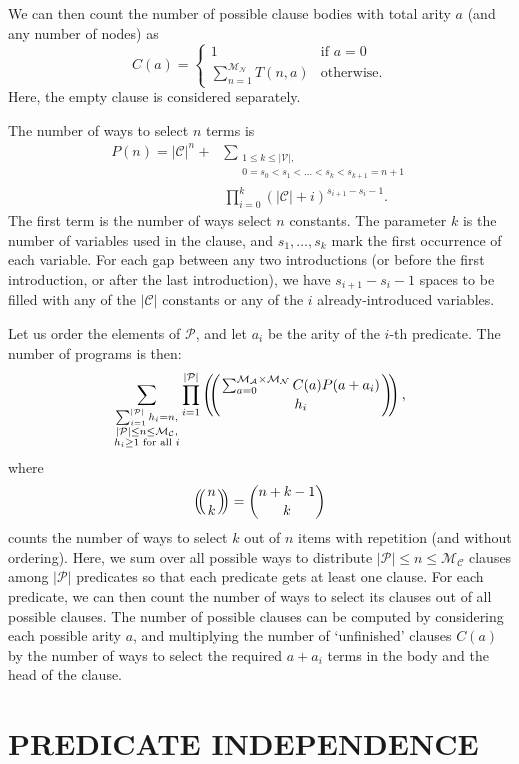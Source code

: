 \documentclass[letterpaper]{article}
\theoremstyle{definition}
\newcommand{\predicates}{\mathcal{P}}
\newcommand{\variables}{\mathcal{V}}
\newcommand{\constants}{\mathcal{C}}
\newcommand{\maxArity}{\mathcal{M}_{\mathcal{A}}}
\newcommand{\maxNumNodes}{\mathcal{M}_{\mathcal{N}}}
\newcommand{\maxNumClauses}{\mathcal{M}_{\mathcal{C}}}
\def\multiset#1#2{\ensuremath{\left(\kern-.3em\left(\genfrac{}{}{0pt}{}{#1}{#2}\right)\kern-.3em\right)}}
\begin{document}
We can then count the number of possible clause bodies with total arity $a$ (and
any number of nodes) as
\[
  C(a) = \begin{cases}
    1 & \text{if } a = 0\\
    \sum_{n=1}^{\maxNumNodes{}} T(n, a) & \text{otherwise.}
  \end{cases}
\]
Here, the empty clause is considered separately.

The number of ways to select $n$ terms is
\begin{align*}
  P(n) = |\constants{}|^n + &\sum_{\substack{1 \le k \le |\variables{}|, \\ 0 =
      s_0 < s_1 < \dots < s_k < s_{k+1} = n+1}}\\
  &\prod_{i=0}^k (|\constants{}| + i)^{s_{i+1} - s_i - 1}.
\end{align*}
The first term is the number of ways select $n$ constants. The parameter $k$ is
the number of variables used in the clause, and $s_1, \dots, s_k$ mark the first
occurrence of each variable. For each gap between any two introductions (or
before the first introduction, or after the last introduction), we have
$s_{i+1}-s_i-1$ spaces to be filled with any of the $|\constants{}|$ constants
or any of the $i$ already-introduced variables.

Let us order the elements of $\predicates{}$, and let $a_i$ be the arity of the
$i$-th predicate. The number of programs is then:
\[
  \sum_{\substack{ \sum_{i=1}^{|\predicates{}|} h_i = n,\\
      |\predicates{}| \le n \le \maxNumClauses,\\
      h_i \ge 1 \text{ for all } i}} \prod_{i=1}^{|\predicates{}|}
  \multiset{\sum_{a=0}^{\maxArity{} \times \maxNumNodes{}} C(a) P(a+a_i)}{h_i},
\]
where
\[
  \multiset{n}{k} = \binom{n+k-1}{k}
\]
counts the number of ways to select $k$ out of $n$ items with repetition (and
without ordering). Here, we sum over all possible ways to distribute
$|\predicates{}| \le n \le \maxNumClauses{}$ clauses among $|\predicates{}|$
predicates so that each predicate gets at least one clause. For each predicate,
we can then count the number of ways to select its clauses out of all possible
clauses. The number of possible clauses can be computed by considering each
possible arity $a$, and multiplying the number of `unfinished' clauses $C(a)$ by
the number of ways to select the required $a+a_i$ terms in the body and the head
of the clause.

\section{PREDICATE INDEPENDENCE} \label{sec:independence}
\end{document}
